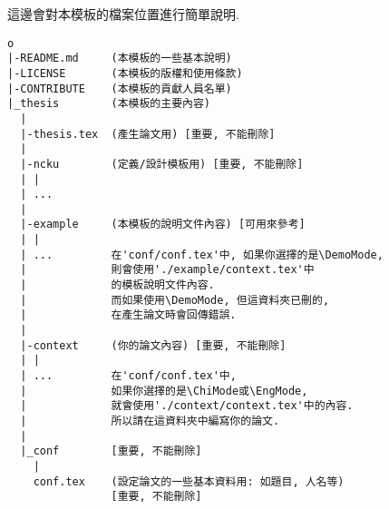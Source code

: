 
這邊會對本模板的檔案位置進行簡單說明.

\begin{framed}
\begin{verbatim}
o
|-README.md     (本模板的一些基本說明)
|-LICENSE       (本模板的版權和使用條款)
|-CONTRIBUTE    (本模板的貢獻人員名單)
|_thesis        (本模板的主要內容)
  |
  |-thesis.tex  (產生論文用) [重要, 不能刪除]
  | 
  |-ncku        (定義/設計模板用) [重要, 不能刪除]
  | |
  | ...
  |
  |-example     (本模板的說明文件內容) [可用來參考]
  | |
  | ...         在'conf/conf.tex'中, 如果你選擇的是\DemoMode,
  |             則會使用'./example/context.tex'中
  |             的模板說明文件內容.
  |             而如果使用\DemoMode, 但這資料夾已刪的,
  |             在產生論文時會回傳錯誤.
  |
  |-context     (你的論文內容) [重要, 不能刪除]
  | |
  | ...         在'conf/conf.tex'中,
  |             如果你選擇的是\ChiMode或\EngMode,
  |             就會使用'./context/context.tex'中的內容.
  |             所以請在這資料夾中編寫你的論文.
  |
  |_conf        [重要, 不能刪除]
    |
    conf.tex    (設定論文的一些基本資料用: 如題目, 人名等)
                [重要, 不能刪除]
\end{verbatim}
\end{framed}

